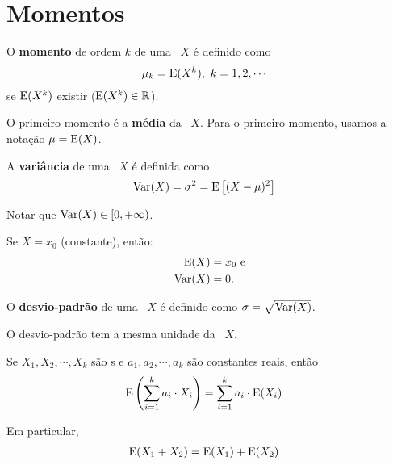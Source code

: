 \section{Momentos}

\begin{definition}\label{def:ch02-momento}
    O \textbf{momento} de ordem $k$ de uma \va\ $X$
    é definido como
    \begin{align}
        \mu_k &= \operatorname{E}(X^k),\ k = 1,2,\cdots
        \label{eq:ch02-def-momento}
    \end{align}
    se $\operatorname{E}(X^k)$ existir ($\operatorname{E}(X^k) \in \operatorname{\mathbb{R}}$).

    \begin{obs}
        O primeiro momento é a \textbf{média} da \va\ $X$.
        Para o primeiro momento, usamos a notação
        $\mu = \operatorname{E}(X)$.
    \end{obs}
\end{definition}

\begin{definition}
    A \textbf{variância} de uma \va\ $X$ é definida como
    \begin{align}
        \operatorname{Var}(X) &= \sigma^2 = \operatorname{E}\left[(X-\mu)^2\right]
        \label{eq:ch02-def-variancia}
    \end{align}

    Notar que $\operatorname{Var}(X) \in [0, +\infty)$.
\end{definition}

\begin{obs}
    Se $X = x_0$ (constante), então:
    \begin{align*}
        \operatorname{E}(X) &= x_0\text{ e} \\
        \operatorname{Var}(X) &= 0.
    \end{align*}
\end{obs}

\begin{definition}
    O \textbf{desvio-padrão} de uma \va\ $X$ é definido como
    $\sigma = \sqrt{\operatorname{Var}(X)}$.

    O desvio-padrão tem a mesma unidade da \va\ $X$.
\end{definition}

\begin{property}
    Se $X_1, X_2, \cdots, X_k$ são \va s e 
    $a_1, a_2, \cdots, a_k$ são constantes reais, então
    \begin{align}
        \operatorname{E}\left(\sum_{i=1}^k a_i \cdot X_i\right)
        &= \sum_{i=1}^k a_i \cdot \operatorname{E}(X_i)
        \label{eq:ch02-media-da-soma}
    \end{align}

    Em particular,
    \begin{align*}
        \operatorname{E}(X_1 + X_2) &= \operatorname{E}(X_1) + \operatorname{E}(X_2)
    \end{align*}
\end{property}

